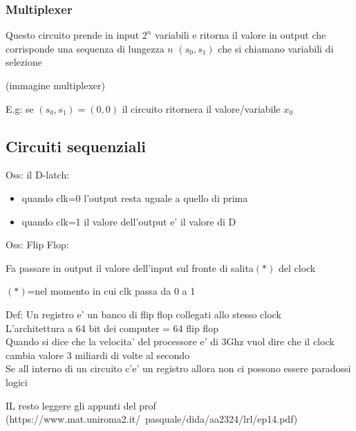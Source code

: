 \documentclass{article}
\begin{document}
          \subsubsection{Multiplexer}
          \begin{flushleft}
            Questo circuito prende in input $2^n$ variabili e ritorna il valore in output che corrisponde una sequenza di lungezza $n$ $(s_0,s_1)$
            che si chiamano variabili di selezione
          \end{flushleft}
          (immagine multiplexer)
          \begin{flushleft}
            E.g: se $(s_0,s_1)=(0,0)$ il circuito ritornera il valore/variabile $x_0$
          \end{flushleft}
          \subsection{Circuiti sequenziali}
          \begin{flushleft}
            Oss: il D-latch:
          \end{flushleft}
          \begin{itemize}
            \item quando clk=0 l'output resta uguale a quello di prima
            \item quando clk=1 il valore dell'output e' il valore di D
          \end{itemize}
          Oss: Flip Flop:
          \begin{flushleft}
            Fa passare in output il valore dell'input sul fronte di salita$(*)$ del clock
          \end{flushleft}
          \begin{flushleft}
            $(*)$=nel momento in cui clk passa da 0 a 1
          \end{flushleft}
          \begin{flushleft}
            Def: Un registro e' un banco di flip flop collegati allo stesso clock \\ 
            L'architettura a 64 bit dei computer = 64 flip flop \\ 
            Quando si dice che la velocita' del processore e' di 3Ghz vuol dire che il clock cambia valore 3 miliardi di volte al secondo \\ 
            Se all interno di un circuito c'e' un registro allora non ci possono essere paradossi logici
          \end{flushleft}
          \begin{flushleft}
            IL resto leggere gli appunti del prof (https://www.mat.uniroma2.it/~pasquale/dida/aa2324/lrl/ep14.pdf)
          \end{flushleft}
\end{document}
